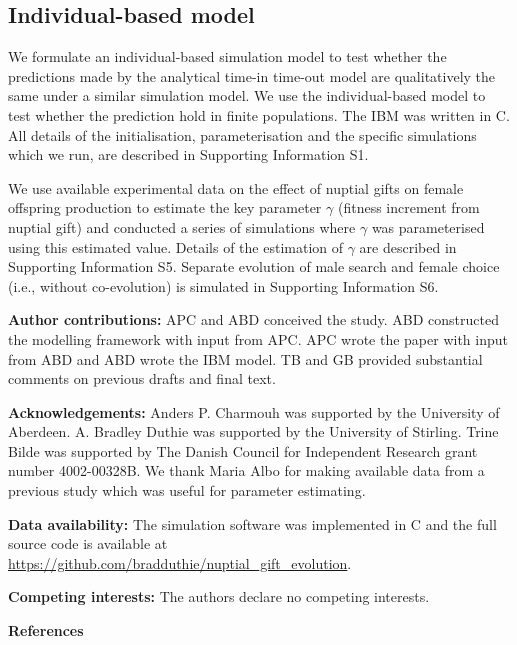 \documentclass[
]{article}
\begin{document}
\hypertarget{individual-based-model}{%
\subsection{Individual-based model}\label{individual-based-model}}

We formulate an individual-based simulation model to test whether the
predictions made by the analytical time-in time-out model are
qualitatively the same under a similar simulation model. We use the
individual-based model to test whether the prediction hold in finite
populations. The IBM was written in C. All details of the
initialisation, parameterisation and the specific simulations which we
run, are described in Supporting Information S1.

We use available experimental data on the effect of nuptial gifts on
female offspring production to estimate the key parameter \(\gamma\)
(fitness increment from nuptial gift) and conducted a series of
simulations where \(\gamma\) was parameterised using this estimated
value. Details of the estimation of \(\gamma\) are described in
Supporting Information S5. Separate evolution of male search and female
choice (i.e., without co-evolution) is simulated in Supporting
Information S6.

\textbf{Author contributions:} APC and ABD conceived the study. ABD
constructed the modelling framework with input from APC. APC wrote the
paper with input from ABD and ABD wrote the IBM model. TB and GB
provided substantial comments on previous drafts and final text.

\textbf{Acknowledgements:} Anders P. Charmouh was supported by the
University of Aberdeen. A. Bradley Duthie was supported by the
University of Stirling. Trine Bilde was supported by The Danish Council
for Independent Research grant number 4002-00328B. We thank Maria Albo
for making available data from a previous study which was useful for
parameter estimating.

\textbf{Data availability:} The simulation software was implemented in C
and the full source code is available at
\url{https://github.com/bradduthie/nuptial_gift_evolution}.

\textbf{Competing interests:} The authors declare no competing
interests.

\textbf{References}
\end{document}
